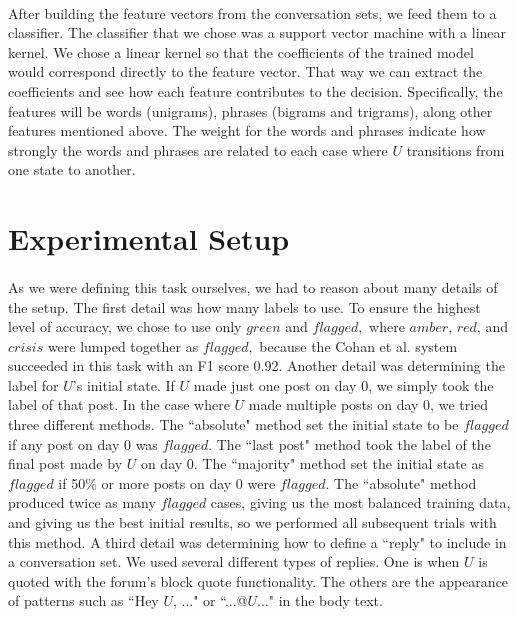 \documentclass{article}
\begin{document}
\paragraph{}After building the feature vectors from the conversation sets, we feed them to a classifier. The classifier that we chose was a support vector machine with a linear kernel. We chose a linear kernel so that the coefficients of the trained model would correspond directly to the feature vector. That way we can extract the coefficients and see how each feature contributes to the decision. Specifically, the features will be words (unigrams), phrases (bigrams and trigrams), along other features mentioned above. The weight for the words and phrases indicate how strongly the words and phrases are related to each case where $U$ transitions from one state to another. 

\section{Experimental Setup}

\paragraph{}As we were defining this task ourselves, we had to reason about many details of the setup. The first detail was how many labels to use. To ensure the highest level of accuracy, we chose to use only $green$ and $flagged,$ where $amber$, $red$, and $crisis$ were lumped together as $flagged,$ because the Cohan et al. system succeeded in this task with an F1 score 0.92. Another detail was determining the label for $U$'s initial state. If $U$ made just one post on day 0, we simply took the label of that post. In the case where $U$ made multiple posts on day 0, we tried three different methods. The ``absolute" method set the initial state to be $flagged$ if any post on day 0 was $flagged$. The ``last post" method took the label of the final post made by $U$ on day 0. The ``majority" method set the initial state as $flagged$ if 50\% or more posts on day 0 were $flagged$. The ``absolute" method produced twice as many $flagged$ cases, giving us the most balanced training data, and giving us the best initial results, so we performed all subsequent trials with this method. A third detail was determining how to define a ``reply" to include in a conversation set. We used several different types of replies. One is when $U$ is quoted with the forum's block quote functionality. The others are the appearance of patterns such as ``Hey $U$, ..." or ``...@$U$..." in the body text.
\end{document}
